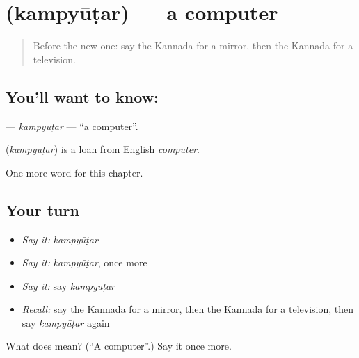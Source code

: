 \section[\texorpdfstring{\kn{ಕಂಪ್ಯೂಟರ್} (kampyūṭar)}{ಕಂಪ್ಯೂಟರ್ (kampyūṭar)}]{ (kampyūṭar) — a computer}

\label{lesson:KA-C137-kampyutar}



\begin{quote}
Before the new one: say the Kannada for a mirror, then the Kannada for a television.
\end{quote}

\subsection*{You'll want to know: }
\textbf{} — \emph{kampyūṭar} — \textquotedblleft{}a computer\textquotedblright{}.

\begin{cousinweb}
\textbf{} (\emph{kampyūṭar}) is a loan from English \emph{computer}.
\end{cousinweb}

\begin{grammarlens}[title={What you've built}]
One more word for this chapter.
\end{grammarlens}

\subsection*{Your turn}
\begin{itemize}
\raggedright
  \item \emph{Say it:} \emph{kampyūṭar}
  \item \emph{Say it:} \emph{kampyūṭar}, once more
  \item \emph{Say it:} say \emph{kampyūṭar}
  \item \emph{Recall:} say the Kannada for a mirror, then the Kannada for a television, then say \emph{kampyūṭar} again
\end{itemize}

\begin{tcolorbox}[breakable,colback=teal!4,colframe=teal!35!black,title={Before you move on}]
What does  mean? (\textquotedblleft{}A computer\textquotedblright{}.) Say it once more.
\end{tcolorbox}
